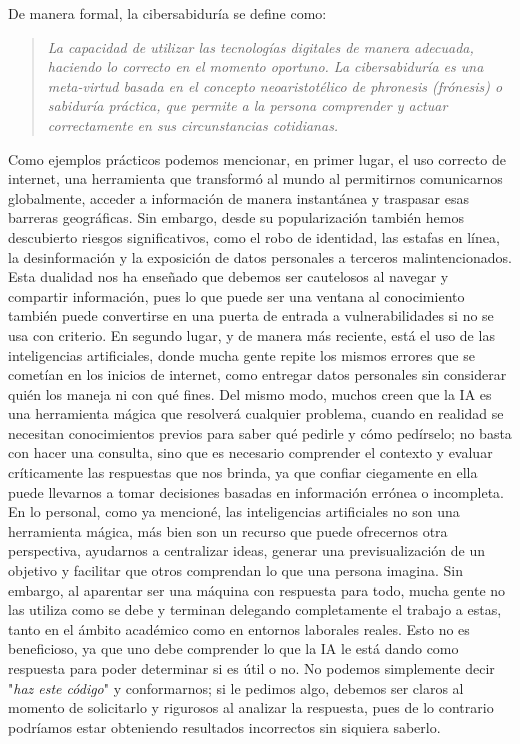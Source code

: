 \documentclass[12pt,letterpaper]{article}
\begin{document}


\newpage

De manera formal, la cibersabiduría se define como:

\begin{quote}
  \textit{La capacidad de utilizar las tecnologías digitales de manera adecuada, haciendo lo correcto en el momento oportuno. La cibersabiduría es una meta-virtud basada en el concepto neoaristotélico de phronesis (frónesis) o sabiduría práctica, que permite a la persona comprender y actuar correctamente en sus circunstancias cotidianas.}
\end{quote}
  
  Como ejemplos prácticos podemos mencionar, en primer lugar, el uso correcto de internet, una herramienta que transformó al mundo al permitirnos comunicarnos globalmente, acceder a información de manera instantánea y traspasar esas barreras geográficas. Sin embargo, desde su popularización también hemos descubierto riesgos significativos, como el robo de identidad, las estafas en línea, la desinformación y la exposición de datos personales a terceros malintencionados. Esta dualidad nos ha enseñado que debemos ser cautelosos al navegar y compartir información, pues lo que puede ser una ventana al conocimiento también puede convertirse en una puerta de entrada a vulnerabilidades si no se usa con criterio. En segundo lugar, y de manera más reciente, está el uso de las inteligencias artificiales, donde mucha gente repite los mismos errores que se cometían en los inicios de internet, como entregar datos personales sin considerar quién los maneja ni con qué fines. Del mismo modo, muchos creen que la IA es una herramienta mágica que resolverá cualquier problema, cuando en realidad se necesitan conocimientos previos para saber qué pedirle y cómo pedírselo; no basta con hacer una consulta, sino que es necesario comprender el contexto y evaluar críticamente las respuestas que nos brinda, ya que confiar ciegamente en ella puede llevarnos a tomar decisiones basadas en información errónea o incompleta.\\

En lo personal, como ya mencioné, las inteligencias artificiales no son una herramienta mágica, más bien son un recurso que puede ofrecernos otra perspectiva, ayudarnos a centralizar ideas, generar una previsualización de un objetivo y facilitar que otros comprendan lo que una persona imagina. Sin embargo, al aparentar ser una máquina con respuesta para todo, mucha gente no las utiliza como se debe y terminan delegando completamente el trabajo a estas, tanto en el ámbito académico como en entornos laborales reales. Esto no es beneficioso, ya que uno debe comprender lo que la IA le está dando como respuesta para poder determinar si es útil o no. No podemos simplemente decir "\textit{haz este código}" y conformarnos; si le pedimos algo, debemos ser claros al momento de solicitarlo y rigurosos al analizar la respuesta, pues de lo contrario podríamos estar obteniendo resultados incorrectos sin siquiera saberlo.\\
\end{document}
